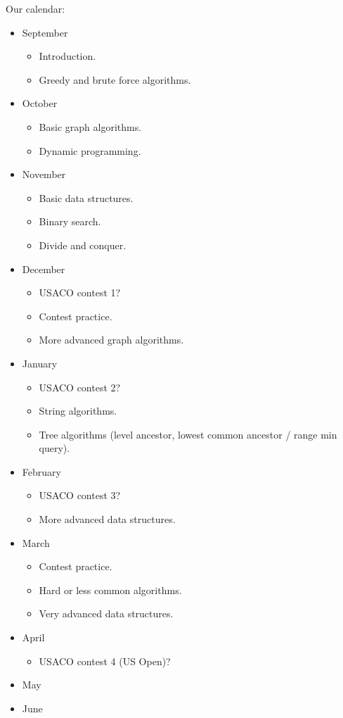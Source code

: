\documentclass[11pt, oneside]{article}   	%
\begin{document}
\newpage

Our calendar:
\begin{itemize}
\item September
\begin{itemize}
\item Introduction.
\item Greedy and brute force algorithms.
\end{itemize}

\item October
\begin{itemize}
\item Basic graph algorithms.
\item Dynamic programming.
\end{itemize}

\item November
\begin{itemize}
\item Basic data structures.
\item Binary search.
\item Divide and conquer.
\end{itemize}

\item December
\begin{itemize}
\item USACO contest 1?
\item Contest practice.
\item More advanced graph algorithms.
\end{itemize}

\item January
\begin{itemize}
\item USACO contest 2?
\item String algorithms.
\item Tree algorithms (level ancestor, lowest common ancestor / range min query).
\end{itemize}

\item February
\begin{itemize}
\item USACO contest 3?
\item More advanced data structures.
\end{itemize}

\item March
\begin{itemize}
\item Contest practice.
\item Hard or less common algorithms.
\item Very advanced data structures.
\end{itemize}

\item April
\begin{itemize}
\item USACO contest 4 (US Open)?
\end{itemize}

\item May

\item June

\end{itemize}
\end{document}

